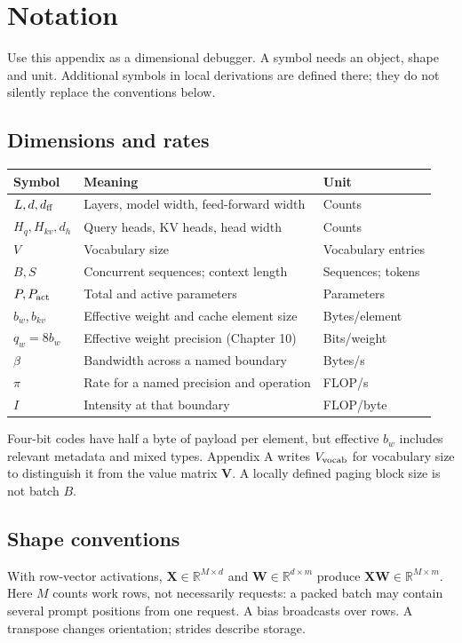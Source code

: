 \chapter{Notation}\label{app:notation}
\begin{ChapterIntent}
Use this appendix as a dimensional debugger. A symbol needs an object,
shape and unit. Additional symbols in local derivations are defined there;
they do not silently replace the conventions below.
\end{ChapterIntent}

\section{Dimensions and rates}
\begin{longtable}{@{}p{.19\linewidth}p{.48\linewidth}p{.24\linewidth}@{}}
\toprule Symbol & Meaning & Unit\\\midrule
$L,d,d_{\rm ff}$ & Layers, model width, feed-forward width & Counts\\
$H_q,H_{kv},d_h$ & Query heads, KV heads, head width & Counts\\
$V$ & Vocabulary size & Vocabulary entries\\
$B,S$ & Concurrent sequences; context length & Sequences; tokens\\
$P,P_{\rm act}$ & Total and active parameters & Parameters\\
$b_w,b_{kv}$ & Effective weight and cache element size & Bytes/element\\
$q_w=8b_w$ & Effective weight precision (Chapter 10) & Bits/weight\\
$\beta$ & Bandwidth across a named boundary & Bytes/s\\
$\pi$ & Rate for a named precision and operation & FLOP/s\\
$I$ & Intensity at that boundary & FLOP/byte\\
\bottomrule
\end{longtable}
Four-bit codes have half a byte of payload per element, but effective
$b_w$ includes relevant metadata and mixed types. Appendix A writes
$V_{\rm vocab}$ for vocabulary size to distinguish it from the value
matrix $\mathbf{V}$. A locally defined paging block size is not batch $B$.

\section{Shape conventions}
With row-vector activations,
$\mathbf{X}\in\mathbb{R}^{M\times d}$ and
$\mathbf{W}\in\mathbb{R}^{d\times m}$ produce
$\mathbf{XW}\in\mathbb{R}^{M\times m}$. Here $M$ counts work rows, not
necessarily requests: a packed batch may contain several prompt positions
from one request. A bias broadcasts over rows. A transpose changes
orientation; strides describe storage.

